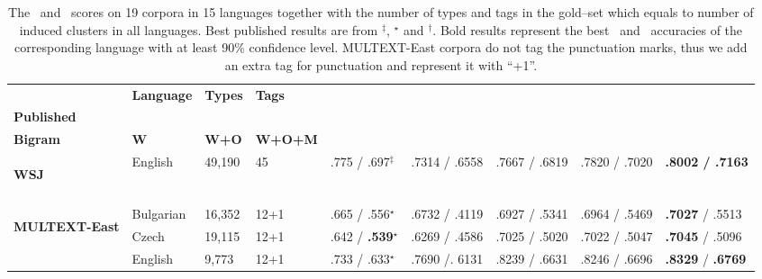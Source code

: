 \begin{table}[ht]
  \centering
  \small
  \caption{The \mto\ and \vm\ scores on 19 corpora in 15 languages
    together with the number of types and tags in the gold--set which
    equals to number of induced clusters in all languages.  Best
    published results are from
    $^\ddagger$\protect\cite{blunsom-cohn:2011:ACL-HLT2011},
    $^\star$\protect\cite{christodoulopoulos-goldwater-steedman:2011:EMNLP}
    and $^\dagger$\protect\cite{Clark:2003:CDM:1067807.1067817}. Bold
    results represent the best \mto\ and \vm\ accuracies of the
    corresponding language with at least 90\% confidence level.
    MULTEXT-East corpora do not tag the punctuation marks, thus we add
    an extra tag for punctuation and represent it with ``+1''.}
  \begin{flushleft}
  \begin{tabular}{|@{ }l@{ }|@{ }l@{ }|@{ }l@{ }|@{ }l@{ }|@{ }l@{ }|@{ }l@{ }|@{ }l@{ }|@{ }l@{ }|@{ }l@{ }|}
        \hline
        & {\bf Language}   & {\bf Types}   & {\bf Tags} & \specialcell{{\bf Best}\\{\bf Published}} &
        \specialcell{{\bf Syntagmatic}\\{\bf Bigram}} &{\bf W}
        & {\bf W+O}            & {\bf W+O+M}     \\ \hline %
        \multirow{1}{*}{\begin{sideways}\textbf{WSJ}\end{sideways}} 
        & English    & 49,190  & 45 & .775 / .697$^\ddagger$  &.7314 / .6558 & .7667 / .6819 & .7820 / .7020 &{\bf.8002 / .7163}           \\
        & & & & & & & &\\ \hline
        \multirow{8}{*}{\begin{sideways}\textbf{MULTEXT-East}\end{sideways}}
        & Bulgarian    & 16,352  & 12+1 & .665 / .556$^\star$    & .6732 / .4119 & .6927 / .5341 & .6964 / .5469     & {\bf.7027} / .5513 \\
        & Czech      & 19,115  & 12+1 & .642 / {\bf.539}$^\star$    & .6269 / .4586 & .7025 / .5020 & .7022 / .5047     & {\bf .7045} / .5096 \\
        & English    & 9,773   & 12+1 & .733 / .633$^\star$    & .7690 /. 6131 & .8239 / .6631 & .8246 / .6696      & {\bf .8329} / {\bf.6769} \\

\end{tabular}
\end{flushleft}
\end{table}
